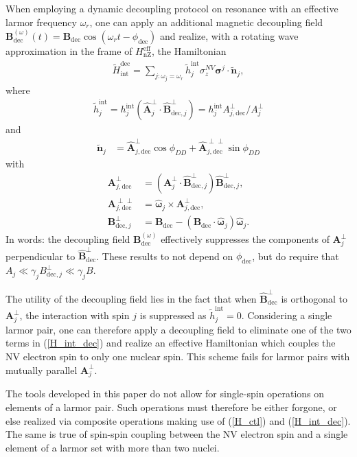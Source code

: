 \documentclass[twocolumn]{revtex4}
\renewcommand{\t}{\text} %
\newcommand{\p}[1]{\left(#1\right)} %
\renewcommand{\v}{\bm} %
\newcommand{\uv}[1]{\hat{\v{#1}}} %
\renewcommand{\c}{\cdot} %
\begin{document}
When employing a dynamic decoupling protocol on resonance with an
effective larmor frequency $\omega_r$, one can apply an additional
magnetic decoupling field
$\v B_\t{dec}^{\p\omega}\p{t}=\v B_\t{dec}\cos\p{\omega_r
  t-\phi_\t{dec}}$ and realize, with a rotating wave approximation in
the frame of $H_\t{nZ}^\t{eff}$, the Hamiltonian
\begin{align}
  \tilde H_\t{int}^\t{dec} = \sum_{j:\omega_j=\omega_r}
  \tilde h_j^\t{int}\sigma_z^{NV}\v\sigma^j\c\tilde{\v n}_j,
  \label{H_int_dec}
\end{align}
where
\begin{align}
  \tilde h_j^\t{int}
  = h_j^\t{int}\p{\uv A_j^\perp\c\uv B_{\t{dec},j}^\perp}
  = h_j^\t{int}A_{j,\t{dec}}^\perp/A_j^\perp
\end{align}
and
\begin{align}
  \tilde{\v n}_j
  &= \uv A_{j,\t{dec}}^\perp\cos\phi_{DD}
    + \uv A_{j,\t{dec}}^{\perp\perp}\sin\phi_{DD}
\end{align}
with
\begin{align}
  \v A_{j,\t{dec}}^\perp
  &= \p{\v A_j^{\perp}\c\uv B_{\t{dec},j}^\perp}\uv B_{\t{dec},j}^\perp, \\
  \v A_{j,\t{dec}}^{\perp\perp}
  &= \uv\omega_j\times\v A_{j,\t{dec}}^\perp, \\
  \v B_{\t{dec},j}^\perp
  &= \v B_\t{dec} - \p{\v B_\t{dec}\c\uv\omega_j}\uv\omega_j.
\end{align} %
In words: the decoupling field $\v B_\t{dec}^{\p\omega}$ effectively
suppresses the components of $\v A_j^\perp$ perpendicular to
$\uv B_\t{dec}^\perp$. These results to not depend on $\phi_\t{dec}$,
but do require that $A_j\ll\gamma_jB_{\t{dec},j}^\perp\ll\gamma_jB$.

The utility of the decoupling field lies in the fact that when
$\uv B_\t{dec}^\perp$ is orthogonal to $\v A_j^\perp$, the interaction
with spin $j$ is suppressed as $\tilde h_j^\t{int}=0$. Considering a
single larmor pair, one can therefore apply a decoupling field to
eliminate one of the two terms in (\ref{H_int_dec}) and realize an
effective Hamiltonian which couples the NV electron spin to only one
nuclear spin. This scheme fails for larmor pairs with mutually
parallel $\v A_j^\perp$.

The tools developed in this paper do not allow for single-spin
operations on elements of a larmor pair. Such operations must
therefore be either forgone, or else realized via composite operations
making use of (\ref{H_ctl}) and (\ref{H_int_dec}). The same is true of
spin-spin coupling between the NV electron spin and a single element
of a larmor set with more than two nuclei.
\end{document}
